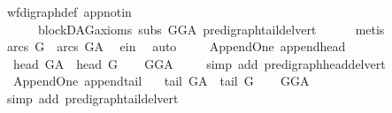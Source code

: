 \begin{isabellebody}
\ wf{\isacharunderscore}{\kern0pt}digraph{\isacharunderscore}{\kern0pt}def\ app{\isacharunderscore}{\kern0pt}notin\ \isanewline
\ \ \ \ \ \ blockDAG{\isacharunderscore}{\kern0pt}axioms\ subs\ GG{\isacharunderscore}{\kern0pt}A\ pre{\isacharunderscore}{\kern0pt}digraph{\isachardot}{\kern0pt}tail{\isacharunderscore}{\kern0pt}del{\isacharunderscore}{\kern0pt}vert\isanewline
\ \ \ \ \isamarkupfalse%
\ metis\ \isanewline
\ \ \isamarkupfalse%
\ \isamarkupfalse%
\ {\isachardoublequoteopen}arcs\ G\ {\isasymnoteq}\ arcs\ G{\isacharunderscore}{\kern0pt}A{\isachardoublequoteclose}\ \isamarkupfalse%
\ e{\isacharunderscore}{\kern0pt}in\ \isamarkupfalse%
\ auto\isanewline
{}\isamarkupfalse%
%
\endisatagproof
{\isafoldproof}%
%
\isadelimproof
\isanewline
%
\endisadelimproof
\ \ \isanewline
{}\isamarkupfalse%
\ {\isacharparenleft}{\kern0pt}\ Append{\isacharunderscore}{\kern0pt}One{\isacharparenright}{\kern0pt}\ append{\isacharunderscore}{\kern0pt}head{\isacharcolon}{\kern0pt}\ \isanewline
\ \ {\isachardoublequoteopen}head\ G{\isacharunderscore}{\kern0pt}A\ {\isacharequal}{\kern0pt}\ head\ G{\isachardoublequoteclose}\isanewline
%
\isadelimproof
\ \ %
\endisadelimproof
%
\isatagproof
{}\isamarkupfalse%
\ GG{\isacharunderscore}{\kern0pt}A\ \isanewline
\ \ \isamarkupfalse%
\ {\isacharparenleft}{\kern0pt}simp\ add{\isacharcolon}{\kern0pt}\ pre{\isacharunderscore}{\kern0pt}digraph{\isachardot}{\kern0pt}head{\isacharunderscore}{\kern0pt}del{\isacharunderscore}{\kern0pt}vert{\isacharparenright}{\kern0pt}%
\endisatagproof
{\isafoldproof}%
%
\isadelimproof
\ \isanewline
%
\endisadelimproof
\isanewline
{}\isamarkupfalse%
\ {\isacharparenleft}{\kern0pt}\ Append{\isacharunderscore}{\kern0pt}One{\isacharparenright}{\kern0pt}\ append{\isacharunderscore}{\kern0pt}tail{\isacharcolon}{\kern0pt}\ \isanewline
\ \ {\isachardoublequoteopen}tail\ G{\isacharunderscore}{\kern0pt}A\ {\isacharequal}{\kern0pt}\ tail\ G{\isachardoublequoteclose}\isanewline
%
\isadelimproof
\ \ %
\endisadelimproof
%
\isatagproof
{}\isamarkupfalse%
\ GG{\isacharunderscore}{\kern0pt}A\ \isanewline
\ \ \isamarkupfalse%
\ {\isacharparenleft}{\kern0pt}simp\ add{\isacharcolon}{\kern0pt}\ pre{\isacharunderscore}{\kern0pt}digraph{\isachardot}{\kern0pt}tail{\isacharunderscore}{\kern0pt}del{\isacharunderscore}{\kern0pt}vert{\isacharparenright}{\kern0pt}%
\endisatagproof
{\isafoldproof}%
%
\isadelimproof
\ \isanewline

\end{isabellebody}

